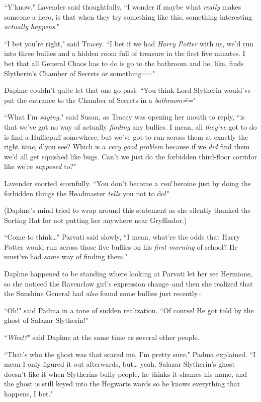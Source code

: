 ``Y'know," Lavender said thoughtfully, ``I wonder if maybe what \emph{really} makes someone a hero, is that when they try something like this, something interesting \emph{actually happens}."

``I bet you're right," said Tracey. ``I bet if we had \emph{Harry Potter} with us, we'd run into three bullies and a hidden room full of treasure in the first five minutes. I bet that all General Chaos has to do is go to the bathroom and he, like, finds Slytherin's Chamber of Secrets or something\==="

Daphne couldn't quite let that one go past. ``You think Lord Slytherin would've put the entrance to the Chamber of Secrets in a \emph{bathroom\===}"

``What I'm \emph{saying}," said Susan, as Tracey was opening her mouth to reply, ``is that we've got no way of actually \emph{finding} any bullies. I mean, all \emph{they've} got to do is find a Hufflepuff somewhere, but we've got to run across them at exactly the right \emph{time}, d'you see? Which is a \emph{very good problem} because if we \emph{did} find them we'd all get squished like bugs. Can't we just do the forbidden third-floor corridor like we're \emph{supposed} to?"

Lavender snorted scornfully. ``You don't become a \emph{real} heroine just by doing the forbidden things the Headmaster \emph{tells} you not to do!"

(Daphne's mind tried to wrap around this statement as she silently thanked the Sorting Hat for not putting her anywhere near Gryffindor.)

``Come to think{\ldots}" Parvati said slowly, ``I mean, what're the odds that Harry Potter would run across those five bullies on his \emph{first morning} of school? He must've had \emph{some} way of finding them."

Daphne happened to be standing where looking at Parvati let her see Hermione, so she noticed the Ravenclaw girl's expression change\---and then she realized that the Sunshine General had \emph{also} found some bullies just recently\---

``Oh!" said Padma in a tone of sudden realization. ``Of course! He got told by the ghost of Salazar Slytherin!"

``\emph{What?}" said Daphne at the same time as several other people.

``That's who the ghost was that scared me, I'm pretty sure," Padma explained. ``I mean I only figured it out afterwards, but{\ldots} yeah. Salazar Slytherin's ghost doesn't like it when Slytherins bully people, he thinks it shames his name, and the ghost is still keyed into the Hogwarts wards so he knows everything that happens, I bet."

